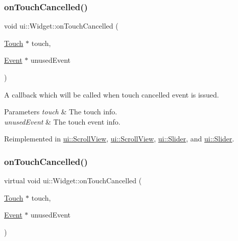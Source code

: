 \subsubsection{\texorpdfstring{on\+Touch\+Cancelled()}{onTouchCancelled()}\hspace{0.1cm}{\footnotesize\ttfamily [1/2]}}
{\footnotesize\ttfamily void ui\+::\+Widget\+::on\+Touch\+Cancelled (\begin{DoxyParamCaption}\item[{\hyperlink{classTouch}{Touch} $\ast$}]{touch,  }\item[{\hyperlink{classEvent}{Event} $\ast$}]{unused\+Event }\end{DoxyParamCaption})\hspace{0.3cm}{\ttfamily [virtual]}}

A callback which will be called when touch cancelled event is issued. 
\begin{DoxyParams}{Parameters}
{\em touch} & The touch info. \\
\hline
{\em unused\+Event} & The touch event info. \\
\hline
\end{DoxyParams}


Reimplemented in \hyperlink{classui_1_1ScrollView_aacfac8af19ae8315530e969897d1217a}{ui\+::\+Scroll\+View}, \hyperlink{classui_1_1ScrollView_ab1dd25cb7c32f13d8920b796986f1fea}{ui\+::\+Scroll\+View}, \hyperlink{classui_1_1Slider_aa8d68a645ef6e82eb6c48214bd5d8001}{ui\+::\+Slider}, and \hyperlink{classui_1_1Slider_aefedbd6e07e51892ed7d82489d600658}{ui\+::\+Slider}.

\mbox{\label{classui_1_1Widget_a4b624372c2171e67c43aac69f9fa5447}} 
\subsubsection{\texorpdfstring{on\+Touch\+Cancelled()}{onTouchCancelled()}\hspace{0.1cm}{\footnotesize\ttfamily [2/2]}}
{\footnotesize\ttfamily virtual void ui\+::\+Widget\+::on\+Touch\+Cancelled (\begin{DoxyParamCaption}\item[{\hyperlink{classTouch}{Touch} $\ast$}]{touch,  }\item[{\hyperlink{classEvent}{Event} $\ast$}]{unused\+Event }\end{DoxyParamCaption})\hspace{0.3cm}{\ttfamily [virtual]}}

